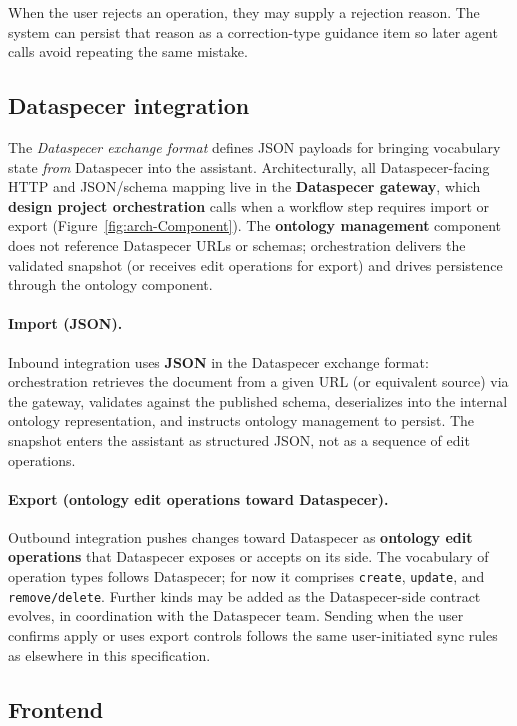 \documentclass{article}
\begin{document}
When the user rejects an operation, they may supply a rejection reason. The system can persist that reason as a correction-type guidance item so later agent calls avoid repeating the same mistake.

\subsection{Dataspecer integration}
\label{sec:dataspecer}

The \emph{Dataspecer exchange format} defines JSON payloads for bringing vocabulary state \emph{from} Dataspecer into the assistant. Architecturally, all Dataspecer-facing HTTP and JSON/schema mapping live in the \textbf{Dataspecer gateway}, which \textbf{design project orchestration} calls when a workflow step requires import or export (Figure~\ref{fig:arch-Component}). The \textbf{ontology management} component does not reference Dataspecer URLs or schemas; orchestration delivers the validated snapshot (or receives edit operations for export) and drives persistence through the ontology component.

\paragraph{Import (JSON).}
Inbound integration uses \textbf{JSON} in the Dataspecer exchange format: orchestration retrieves the document from a given URL (or equivalent source) via the gateway, validates against the published schema, deserializes into the internal ontology representation, and instructs ontology management to persist. The snapshot enters the assistant as structured JSON, not as a sequence of edit operations.

\paragraph{Export (ontology edit operations toward Dataspecer).}
Outbound integration pushes changes toward Dataspecer as \textbf{ontology edit operations} that Dataspecer exposes or accepts on its side. The vocabulary of operation types follows Dataspecer; for now it comprises \texttt{create}, \texttt{update}, and \texttt{remove/delete}. Further kinds may be added as the Dataspecer-side contract evolves, in coordination with the Dataspecer team. Sending when the user confirms apply or uses export controls follows the same user-initiated sync rules as elsewhere in this specification.

\subsection{Frontend}
\end{document}
